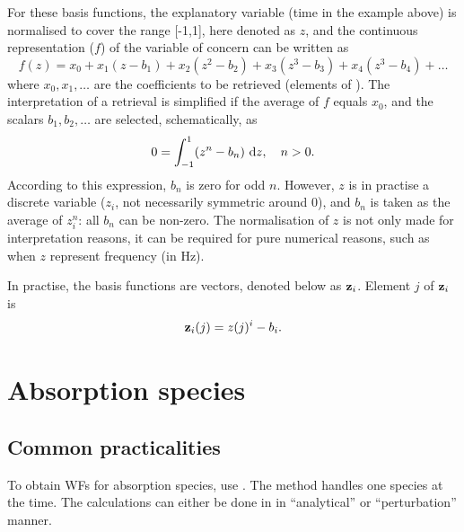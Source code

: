 For these basis functions, the explanatory variable (time in the example above)
is normalised to cover the range [-1,1], here denoted as $z$, and the
continuous representation ($f$) of the variable of concern can be written as
\begin{equation}
  f(z) = x_0 + x_1(z-b_1) + x_2(z^2-b_2) + x_3(z^3-b_3) + x_4(z^3-b_4) + \dots  
\end{equation}
where $x_0, x_1, \dots$ are the coefficients to be retrieved (elements of
\SttVct). The interpretation of a retrieval is simplified if the average of $f$
equals $x_0$, and the scalars $b_1, b_2, \dots$ are selected, schematically, as
\begin{equation}
  0 = \int_{-1}^1 \!\left(z^n-b_n\right) \, \mathrm{d} z, \quad n>0.
\end{equation}
According to this expression, $b_n$ is zero for odd $n$. However, $z$ is in
practise a discrete variable ($z_i$, not necessarily symmetric around 0), and
$b_n$ is taken as the average of $z_i^n$: all $b_n$ can be non-zero. The
normalisation of $z$ is not only made for interpretation reasons, it can be
required for pure numerical reasons, such as when $z$ represent frequency (in
Hz).

In practise, the basis functions are vectors, denoted below as $\mathbf{z}_i$.
Element $j$ of $\mathbf{z}_i$ is
\begin{equation}
  \mathbf{z}_i(j) = z(j)^i - b_i.
\end{equation}





\section{Absorption species}
\label{sec:wfuns:absspecies}

\subsection{Common practicalities}
%
To obtain WFs for absorption species, use . The
method handles one species at the time. The calculations can either be done in
in ``analytical'' or ``perturbation'' manner.

